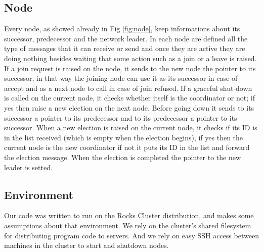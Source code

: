 \documentclass[11pt,conference]{IEEEtran}
\begin{document}
\subsection{Node}
Every node, as showed already in Fig \ref{fig:node}, keep informations about its successor, predecessor and the network leader. In each node are defined all the type of messages that it can receive or send and once they are active they are doing nothing besides waiting that some action such as a join or a leave is raised.
\newline
If a join request is raised on the node, it sends to the new node the pointer to its successor, in that way the joining node can use it as its successor in case of accept and as a next node to call in case of join refused.
If a graceful shut-down is called on the current node, it checks whether itself is the coordinator or not; if yes then raise a new election on the next node. Before going down it sends to its successor a pointer to its predecessor and to its predecessor a pointer to its successor.
\newline
When a new election is raised on the current node, it checks if its ID is in the list received (which is empty when the election begins), if yes then the current node is the new coordinator if not it puts its ID in the list and forward the election message. When the election is completed the pointer to the new leader is setted.

\subsection{Environment}
Our code was written to run on the Rocks Cluster distribution\cite{rocks}, and
makes some assumptions about that environment. We rely on the cluster's shared
filesystem for distributing program code to servers. And we rely on easy SSH
access between machines in the cluster to start and shutdown nodes.
\end{document}
